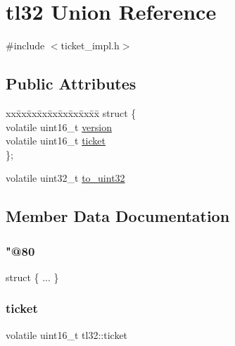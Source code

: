 \hypertarget{uniontl32}{}\section{tl32 Union Reference}
\label{uniontl32}


{\ttfamily \#include $<$ticket\+\_\+impl.\+h$>$}

\subsection*{Public Attributes}
\begin{DoxyCompactItemize}
\item 
\begin{tabbing}
xx\=xx\=xx\=xx\=xx\=xx\=xx\=xx\=xx\=\kill
struct \{\\
\>volatile uint16\_t \hyperlink{uniontl32_a6c0a2ef80fef6bb48ba2801afddf9630}{version}\\
\>volatile uint16\_t \hyperlink{uniontl32_a72f8bd411ad1a860c54f26f755981d17}{ticket}\\
\}; \\

\end{tabbing}\item 
volatile uint32\+\_\+t \hyperlink{uniontl32_a3a11491119d50ccf11a63bfe5b5e2754}{to\+\_\+uint32}
\end{DoxyCompactItemize}


\subsection{Member Data Documentation}
\mbox{\label{uniontl32_a0f0b8de9afbd1ec9a4ae4584f209ac84}} 
\subsubsection{\texorpdfstring{"@80}{@80}}
{\footnotesize\ttfamily struct \{ ... \} }

\mbox{\label{uniontl32_a72f8bd411ad1a860c54f26f755981d17}} 
\subsubsection{\texorpdfstring{ticket}{ticket}}
{\footnotesize\ttfamily volatile uint16\+\_\+t tl32\+::ticket}

\mbox{\label{uniontl32_a3a11491119d50ccf11a63bfe5b5e2754}} 
